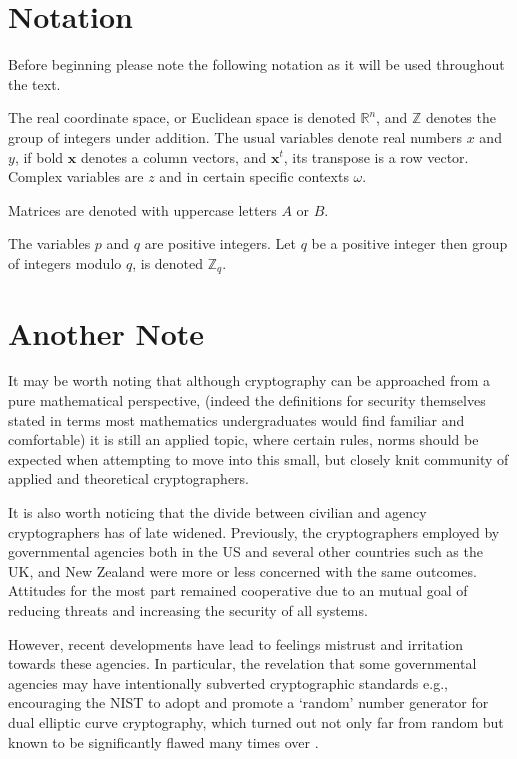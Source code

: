\section{Notation}

Before beginning please note the following notation as it will be used throughout the text.

The real coordinate space, or Euclidean space is denoted $\mathbb{R}^{n}$, and $\mathbb{Z}$ denotes the group of integers under addition.
The usual variables denote real numbers $x$ and $y$, if bold $\mathbf{x}$ denotes a column vectors, and $\mathbf{x}^{t}$, its transpose is a row vector.  Complex variables are $z$ and in certain specific contexts $\omega$. 

Matrices are denoted with uppercase letters $A$ or $B$.

The variables $p$ and $q$ are positive integers. Let $q$ be a positive integer then group of integers modulo $q$, is denoted $\mathbb{Z}_{q}$.


\section{Another Note}


It may be worth noting that although cryptography can be approached from a pure mathematical perspective, (indeed the definitions for security themselves stated in terms most mathematics undergraduates would find familiar and comfortable) it is still an applied topic, where certain rules, norms should be expected when attempting to move into this small, but closely knit community of applied and theoretical cryptographers. 


It is also worth noticing that the divide between civilian and agency cryptographers has of late widened. Previously, the cryptographers employed by governmental agencies both in the US and several other countries such as the UK, and New Zealand were more or less concerned with the same outcomes. Attitudes for the most part remained cooperative due to an mutual goal of reducing threats and increasing the security of all systems. 


However, recent developments have lead to feelings mistrust and irritation towards these agencies. In particular, the revelation that some governmental agencies may have intentionally subverted cryptographic standards e.g., encouraging the NIST to adopt and promote a `random' number generator for dual elliptic curve cryptography, which turned out not only far from random but known to be significantly flawed many times over\cite{Jgr2015} \cite{Sgr2013} \cite{Sch2007}. 


